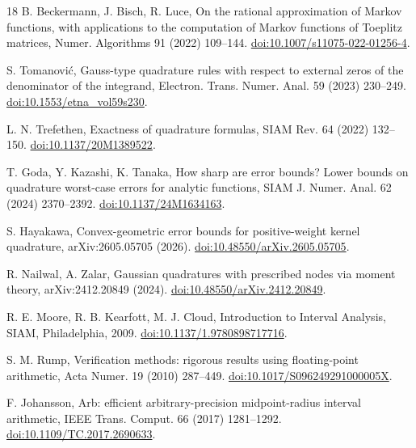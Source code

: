 \documentclass[preprint,12pt]{elsarticle}
\theoremstyle{remark}
\begin{document}
\begin{thebibliography}{18}
B. Beckermann, J. Bisch, R. Luce, On the rational approximation of
Markov functions, with applications to the computation of Markov
functions of Toeplitz matrices, Numer. Algorithms 91 (2022) 109--144.
\href{https://doi.org/10.1007/s11075-022-01256-4}{doi:10.1007/s11075-022-01256-4}.

S. Tomanovi\'c, Gauss-type quadrature rules with respect to external
zeros of the denominator of the integrand, Electron. Trans. Numer.
Anal. 59 (2023) 230--249.
\href{https://doi.org/10.1553/etna_vol59s230}{doi:10.1553/etna\_vol59s230}.

L. N. Trefethen, Exactness of quadrature formulas,
SIAM Rev. 64 (2022) 132--150.
\href{https://doi.org/10.1137/20M1389522}{doi:10.1137/20M1389522}.

T. Goda, Y. Kazashi, K. Tanaka, How sharp are error bounds? Lower
bounds on quadrature worst-case errors for analytic functions,
SIAM J. Numer. Anal. 62 (2024) 2370--2392.
\href{https://doi.org/10.1137/24M1634163}{doi:10.1137/24M1634163}.

S. Hayakawa, Convex-geometric error bounds for positive-weight kernel
quadrature, arXiv:2605.05705 (2026).
\href{https://doi.org/10.48550/arXiv.2605.05705}{doi:10.48550/arXiv.2605.05705}.

R. Nailwal, A. Zalar, Gaussian quadratures with prescribed nodes via
moment theory, arXiv:2412.20849 (2024).
\href{https://doi.org/10.48550/arXiv.2412.20849}{doi:10.48550/arXiv.2412.20849}.

R. E. Moore, R. B. Kearfott, M. J. Cloud, Introduction to Interval
Analysis, SIAM, Philadelphia, 2009.
\href{https://doi.org/10.1137/1.9780898717716}{doi:10.1137/1.9780898717716}.

S. M. Rump, Verification methods: rigorous results using
floating-point arithmetic, Acta Numer. 19 (2010) 287--449.
\href{https://doi.org/10.1017/S096249291000005X}{doi:10.1017/S096249291000005X}.

F. Johansson, Arb: efficient arbitrary-precision midpoint-radius
interval arithmetic, IEEE Trans. Comput. 66 (2017) 1281--1292.
\href{https://doi.org/10.1109/TC.2017.2690633}{doi:10.1109/TC.2017.2690633}.

\end{thebibliography}
\end{document}
